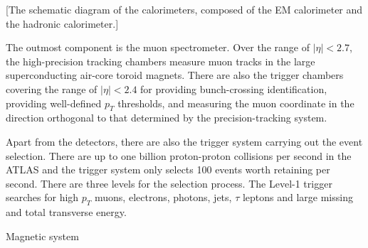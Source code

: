\documentclass[class=NTHU_thesis, crop=false]{standalone}
\begin{document}
[The schematic diagram of the calorimeters, composed of the EM calorimeter and the hadronic calorimeter.]

The outmost component is the muon spectrometer. Over the range of $\left|\eta\right| < 2.7$, the high-precision tracking chambers measure muon tracks in the large superconducting air-core toroid magnets. There are also the trigger chambers covering the range of $\left|\eta\right| < 2.4$ for providing bunch-crossing identification, providing well-defined $p_T$ thresholds, and measuring the muon coordinate in the direction orthogonal to that determined by the precision-tracking system.

Apart from the detectors, there are also the trigger system carrying out the event selection. There are up to one billion proton-proton collisions per second in the ATLAS and the trigger system only selects 100 events worth retaining per second. There are three levels for the selection process. The Level-1 trigger searches for high $p_T$ muons, electrons, photons, jets, $\tau$ leptons and large missing and total transverse energy.

Magnetic system
\end{document}
